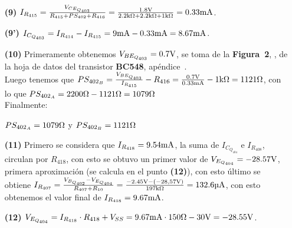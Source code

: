 \begin{sloppypar}
\begin{enumerate}
\item[\textbf{(9)}] $I_{R_{415}} = \frac{V_{CE_{Q_{403}}}}{R_{415} + PS_{402} + R_{416} } = \frac{1.8 \si[per-mode=symbol]{\volt} }{2.2 \si[per-mode=symbol]{\kilo\ohm} + 2.2 \si[per-mode=symbol]{\kilo\ohm} + 1 \si[per-mode=symbol]{\kilo\ohm} } = 0.33 \si[per-mode=symbol]{\milli\ampere} $.


\item[\textbf{(9')}] $I_{C_{Q_{403}}} = I_{R_{414}} - I_{R_{415}} = 9 \si[per-mode=symbol]{\milli\ampere} - 0.33 \si[per-mode=symbol]{\milli\ampere} = 8.67 \si[per-mode=symbol]{\milli\ampere} $.


\item[\textbf{(10)}] Primeramente obtenemos $V_{BE_{Q_{403}}} = 0.7 \si[per-mode=symbol]{\volt} $, se toma de la \textbf{Figura~2}, , de la hoja de datos del transistor \textbf{BC548}, apéndice~.\\

Luego tenemos que $PS_{402_{B}} = \frac{V_{BE_{Q_{403}}}}{I_{R_{415}}} - R_{416} = \frac{0.7 \si[per-mode=symbol]{\volt} }{0.33 \si[per-mode=symbol]{\milli\ampere}  } - 1 \si[per-mode=symbol]{\kilo\ohm} = 1121 \si[per-mode=symbol]{\ohm} $, con lo que $PS_{402_{A}} = 2200 \si[per-mode=symbol]{\ohm} - 1121 \Omega = 1079 \si[per-mode=symbol]{\ohm} $\\

Finalmente:
\begin{center}
$PS_{402_{A}} = 1079 \si[per-mode=symbol]{\ohm} $  y  $PS_{402_{B}} = 1121 \si[per-mode=symbol]{\ohm} $
\end{center}


\item[\textbf{(11)}] Primero se considera que $I_{R_{418}} = 9.54 \si[per-mode=symbol]{\milli\ampere} $, la suma de $I_{C_{Q_{404}}}$ e $I_{R_{408}}$, circulan por $R_{418}$, con esto se obtuvo un primer valor de $V_{E_{Q_{404}}} = -28.57 \si[per-mode=symbol]{\volt} $, primera aproximación (se calcula en el punto \textbf{(12)}), con esto último se obtiene $I_{R_{407}} = \frac{V_{B_{Q_{402}}} - V_{E_{Q_{404}}} }{R_{407} + R_{10} } = \frac{-2.45 \si[per-mode=symbol]{\volt} - (-28,57 \si[per-mode=symbol]{\volt})}{197 \si[per-mode=symbol]{\kilo\ohm} } = 132.6 \si[per-mode=symbol]{\micro\ampere} $, con esto obtenemos el valor final de $I_{R_{418}} = 9.67 \si[per-mode=symbol]{\milli\ampere} $.


\item[\textbf{(12)}] $V_{E_{Q_{404}}} = I_{R_{418}} \cdot R_{418} + V_{SS}  = 9.67 \si[per-mode=symbol]{\milli\ampere} \cdot 150 \si[per-mode=symbol]{\ohm} - 30 \si[per-mode=symbol]{\volt} = -28.55 \si[per-mode=symbol]{\volt} $.




\end{enumerate}
\end{sloppypar}
